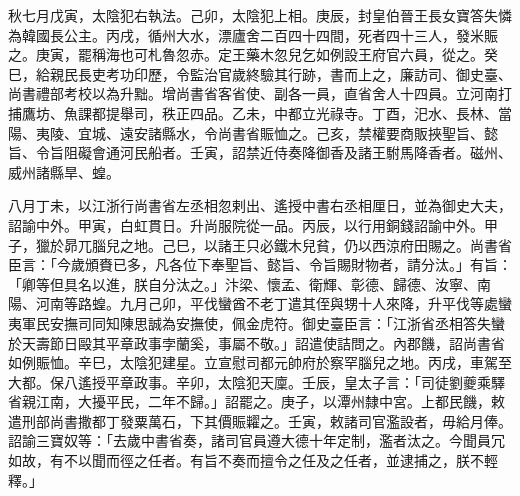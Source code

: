 \begin{pinyinscope}
 秋七月戊寅，太陰犯右執法。己卯，太陰犯上相。庚辰，封皇伯晉王長女寶答失憐為韓國長公主。丙戌，循州大水，漂廬舍二百四十四間，死者四十三人，發米賑之。庚寅，罷稱海也可札魯忽赤。定王藥木忽兒乞如例設王府官六員，從之。癸巳，給親民長吏考功印歷，令監治官歲終驗其行跡，書而上之，廉訪司、御史臺、尚書禮部考校以為升黜。增尚書省客省使、副各一員，直省舍人十四員。立河南打捕鷹坊、魚課都提舉司，秩正四品。乙未，中都立光祿寺。丁酉，汜水、長林、當陽、夷陵、宜城、遠安諸縣水，令尚書省賑恤之。己亥，禁權要商販挾聖旨、懿旨、令旨阻礙會通河民船者。壬寅，詔禁近侍奏降御香及諸王駙馬降香者。磁州、威州諸縣旱、蝗。



 八月丁未，以江浙行尚書省左丞相忽剌出、遙授中書右丞相厘日，並為御史大夫，詔諭中外。甲寅，白虹貫日。升尚服院從一品。丙辰，以行用銅錢詔諭中外。甲子，獵於昴兀腦兒之地。己巳，以諸王只必鐵木兒貧，仍以西涼府田賜之。尚書省臣言：「今歲頒賚已多，凡各位下奉聖旨、懿旨、令旨賜財物者，請分汰。」有旨：「卿等但具名以進，朕自分汰之。」汴梁、懷孟、衛輝、彰德、歸德、汝寧、南陽、河南等路蝗。九月己卯，平伐蠻酋不老丁遣其侄與甥十人來降，升平伐等處蠻夷軍民安撫司同知陳思誠為安撫使，佩金虎符。御史臺臣言：「江浙省丞相答失蠻於天壽節日毆其平章政事孛蘭奚，事屬不敬。」詔遣使詰問之。內郡饑，詔尚書省如例賑恤。辛巳，太陰犯建星。立宣慰司都元帥府於察罕腦兒之地。丙戌，車駕至大都。保八遙授平章政事。辛卯，太陰犯天廩。壬辰，皇太子言：「司徒劉夔乘驛省親江南，大擾平民，二年不歸。」詔罷之。庚子，以潭州隸中宮。上都民饑，敕遣刑部尚書撒都丁發粟萬石，下其價賑糶之。壬寅，敕諸司官濫設者，毋給月俸。詔諭三寶奴等：「去歲中書省奏，諸司官員遵大德十年定制，濫者汰之。今聞員冗如故，有不以聞而徑之任者。有旨不奏而擅令之任及之任者，並逮捕之，朕不輕釋。」




\end{pinyinscope}
